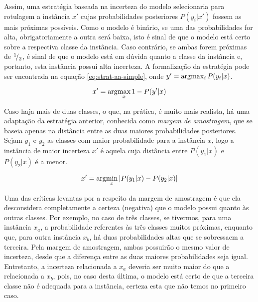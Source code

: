 Assim, uma estratégia baseada na incerteza do modelo selecionaria para rotulagem a instância $x'$ cujas probabilidades posteriores $P(y_i|x')$ fossem as mais próximas possíveis. Como o modelo é binário, se uma das probabilidades for alta, obrigatoriamente a outra será baixa, isto é sinal de que o modelo está certo sobre a respectiva classe da instância. Caso contrário, se ambas forem próximas de ${}^{1}\!/_{2}$, é sinal de que o modelo está em dúvida quanto a classe da instância e, portanto, esta instância possui alta incerteza. A formalização da estratégia pode ser encontrada na equação \ref{eq:strat-aa-simple}, onde $y' = \arg\!\max_i P(y_i|x)$.

\begin{equation}
x' = \arg\!\max_x 1 - P(y'|x)
\label{eq:strat-aa-simple}
\end{equation}

Caso haja mais de duas classes, o que, na prática, é muito mais realista, há uma adaptação da estratégia anterior, conhecida como \textit{margem de amostragem}, que se baseia apenas na distância entre as duas maiores probabilidades posteriores. Sejam $y_1$ e $y_2$ as classes com maior probabilidade para a instância $x$, logo a instância de maior incerteza $x'$ é aquela cuja distância entre $P(y_1|x)$ e $P(y_2|x)$ é a menor.

\begin{equation}
x' = \arg\!\min_x |P(y_1|x) - P(y_2|x)|
\end{equation}

Uma das críticas levantas por \citep{settles.tr09} a respeito da margem de amostragem é que ela desconsidera completamente a certeza (negativa) que o modelo possui quanto às outras classes. Por exemplo, no caso de três classes, se tivermos, para uma instância $x_a$, a probabilidade referentes às três classes muitos próximas, enquanto que, para outra instância $x_b$, há duas probabilidades altas que se sobressaem a terceira. Pela margem de amostragem, ambas possuirão o mesmo valor de incerteza, desde que a diferença entre as duas maiores probabilidades seja igual. Entretanto, a incerteza relacionada a $x_a$ deveria ser muito maior do que a relacionada a $x_b$, pois, no caso desta última, o modelo está certo de que a terceira classe não é adequada para a instância, certeza esta que não temos no primeiro caso.

